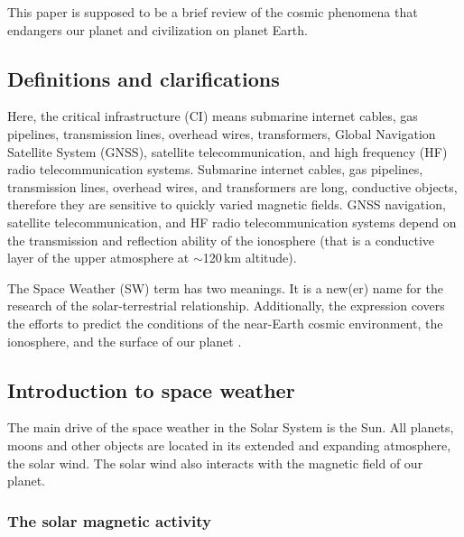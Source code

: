 \documentclass[sn-aps]{sn-jnl}%
\begin{document}
This paper is supposed to be a brief review of the cosmic phenomena that endangers our planet and civilization on planet Earth. 

\subsection{Definitions and clarifications}
\label{sec:def}

Here, the critical infrastructure (CI) means submarine internet cables, gas pipelines, transmission lines, overhead wires, transformers, Global Navigation Satellite System (GNSS), satellite telecommunication, and high frequency (HF) radio telecommunication systems. Submarine internet cables, gas pipelines, transmission lines, overhead wires, and transformers are long, conductive objects, therefore they are sensitive to quickly varied magnetic fields. GNSS navigation, satellite telecommunication, and HF radio telecommunication systems depend on the transmission and reflection ability of the ionosphere (that is a conductive layer of the upper atmosphere at $\sim$120\,km altitude).

The Space Weather (SW) term has two meanings. It is a new(er) name for the research of the solar-terrestrial relationship. Additionally, the expression covers the efforts to predict the conditions of the near-Earth cosmic environment, the ionosphere, and the surface of our planet \cite{scherer05:_space_weath}. 


\subsection{Introduction to space weather}
\label{sec:swintro}

The main drive of the space weather in the Solar System is the Sun. All planets, moons and other objects are located in its extended and expanding atmosphere, the solar wind. The solar wind also interacts with the magnetic field of our planet.

\subsubsection{The solar magnetic activity}
\label{sec:magnact}
\end{document}
